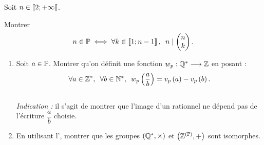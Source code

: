 \begin{corr}
\end{corr}

\begin{exo}[Exercice 15]
Soit \(n\in\left\llbracket2;+\infty\right\llbracket\).

Montrer \[n\in\prem\ssi\quantifs{\forall k\in\interventierii{1}{n-1}}n\divise\binom{k}{n}.\]
\end{exo}

\begin{corr}
\end{corr}

\begin{exo}
\begin{enumerate}
\item Soit \(a\in\mathbb{P}\). Montrer qu'on définit une fonction \(w_p:\mathbb{Q}^*\longrightarrow\mathbb{Z}\) en posant : \[\quantifs{\forall a\in\Zs;\forall b\in\Ns}w_p\paren{\dfrac{a}{b}}=\valp{p}{a}-\valp{p}{b}.\] \\

\textit{Indication :} il s'agit de montrer que l'image d'un rationnel ne dépend pas de l'écriture \(\dfrac{a}{b}\) choisie. \\

\item En utilisant l', montrer que les groupes \(\groupe{\Qs}[\times]\) et \(\groupe{\Z^{\paren{\prem}}}\) sont isomorphes.
\end{enumerate}
\end{exo}

\begin{corr}
\end{corr}

